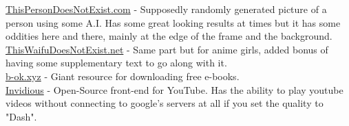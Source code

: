 \documentclass{article}
\begin{document}
\href{https://thispersondoesnotexist.com/}{ThisPersonDoesNotExist.com} - Supposedly randomly generated picture of a person using some A.I. Has some great looking results at times but it has some oddities here and there, mainly at the edge of the frame and the background.\\
\href{https://www.thiswaifudoesnotexist.net/}{ThisWaifuDoesNotExist.net} - Same part but for anime girls, added bonus of having some supplementary text to go along with it.\\
\href{https://b-ok.xyz/}{b-ok.xyz} - Giant resource for downloading free e-books.\\
\href{https://invidio.us/}{Invidious} - Open-Source front-end for YouTube. Has the ability to play youtube videos without connecting to google's servers at all if you set the quality to "Dash".\\
\end{document}
